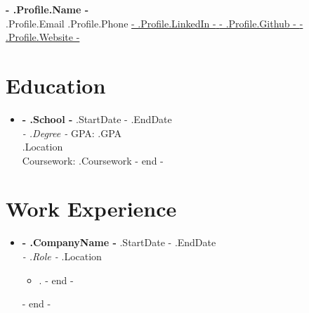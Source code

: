 \documentclass[11pt]{article}
\newcommand{\linkedinicon}{\faLinkedinSquare}
\newcommand{\githubicon}{\faGithub}
\newcommand{\websiteicon}{\faGlobe}
\newcommand{\emailicon}{\faEnvelope}
\newcommand{\phoneicon}{\faPhone}
\begin{document}
\begin{center}
    {\Huge \textbf{ {{- .Profile.Name -}} }} \\
    \vspace{0.5em}
    \emailicon \hspace{0.2em} {{ .Profile.Email }} \hspace{1em}
    \phoneicon \hspace{0.2em} {{ .Profile.Phone }} \hspace{1em}
    \linkedinicon \hspace{0.2em} \href{ {{- .Profile.LinkedIn -}} }{ {{- .Profile.LinkedIn -}} } \hspace{1em}
    \githubicon \hspace{0.2em} \href{ {{- .Profile.Github -}} }{ {{- .Profile.Github -}} } \hspace{1em}
    \websiteicon \hspace{0.2em} \href{ {{- .Profile.Website -}} }{ {{- .Profile.Website -}} } \\
    \vspace{1em}
\end{center}

\section*{Education}
\begin{itemize}[leftmargin=*]
    {{- range .Educations -}}
    \item \textbf{ {{- .School -}} } \hfill {{ .StartDate }} - {{ .EndDate }} \\
    \textit{ {{- .Degree -}} } \hfill GPA: {{ .GPA }} \\
    {{ .Location }} \\
    Coursework: {{ .Coursework }}
    {{- end -}}
\end{itemize}

\section*{Work Experience}
\begin{itemize}[leftmargin=*]
    {{- range .WorkExperiences -}}
    \item \textbf{ {{- .CompanyName -}} } \hfill {{ .StartDate }} - {{ .EndDate }} \\
    \textit{ {{- .Role -}} } \hfill {{ .Location }} \\
    \begin{itemize}
        {{- range .Description -}}
        \item {{ . }}
        {{- end -}}
    \end{itemize}
    {{- end -}}
\end{itemize}
\end{document}
